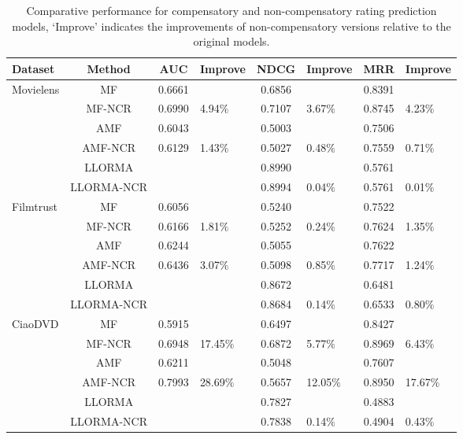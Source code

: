 \documentclass[letterpaper]{article} %
\begin{document}
\begin{table}[htp]
\tiny
\caption{Comparative performance for compensatory and non-compensatory rating prediction models, `Improve' indicates the improvements of non-compensatory versions relative to the original models.}
\begin{center}
\begin{tabular}{|p{0.7cm}<{\centering}|c|c|p{0.5cm}<{\centering}|c|p{0.5cm}<{\centering}|c|p{0.5cm}<{\centering}|}
\hline
Dataset	& Method	& AUC	& Improve&	NDCG&	Improve&	MRR	&Improve\\\hline
\multirow{6}{*}{Movielens} &	MF	& 0.6661 	& &	0.6856 	&&	0.8391 	&\\
\cline{2-8}
	&MF-NCR	&0.6990 &	4.94$\%$	&0.7107 	&3.67$\%$	&0.8745 &	4.23$\%$	\\
	\cline{2-8}
	&AMF&	0.6043 	&&	0.5003 	&&	0.7506 &\\
	\cline{2-8}
	&AMF-NCR	&0.6129 	&1.43$\%$	&0.5027 &	0.48$\%$	&0.7559 	&0.71$\%$	\\
	\cline{2-8}
	&LLORMA		&&	&0.8990 	&&	0.5761&\\	
	\cline{2-8}
	&LLORMA-NCR	&&&		0.8994 	&0.04$\%$	&0.5761 	&0.01$\%$	\\
	\hline
\multirow{6}{*}{Filmtrust}	&MF	&0.6056 	&&	0.5240 &&		0.7522 	&	\\
\cline{2-8}
	&MF-NCR&	0.6166 	&1.81$\%$	&0.5252 	&0.24$\%$	&0.7624 	&1.35$\%$\\
	\cline{2-8}
	&AMF	&0.6244 	&&	0.5055 &&		0.7622 	&	\\
	\cline{2-8}
	&AMF-NCR	&0.6436 	&3.07$\%$	&0.5098 	&0.85$\%$	&0.7717 	&1.24$\%$	\\
	\cline{2-8}
	&LLORMA	&& &		0.8672 	&&	0.6481 	&	\\
	\cline{2-8}
	&LLORMA-NCR		&&&	0.8684 &	0.14$\%$	&0.6533 	&0.80$\%$	\\
	\hline
\multirow{6}{*}{CiaoDVD}	&MF	&0.5915 	&&	0.6497 &	&	0.8427 &	\\
\cline{2-8}
	&MF-NCR	&0.6948 	&17.45$\%$	&0.6872 	&5.77$\%$	&0.8969 	&6.43$\%$	\\
	\cline{2-8}
	&AMF	&0.6211 	&&	0.5048 	&&	0.7607 	&	\\
	\cline{2-8}
	&AMF-NCR	&0.7993 &	28.69$\%$	&0.5657 	&12.05$\%$	&0.8950 	&17.67$\%$	\\
	\cline{2-8}
	&LLORMA		&&	&0.7827 		&&0.4883 		& 	\\
	\cline{2-8}
	&LLORMA-NCR	&& &		0.7838 	&0.14$\%$	&0.4904 	&0.43$\%$	\\
	\hline
	\end{tabular}
\end{center}
\label{tab:ratingresult}
\end{table}%
\end{document}

